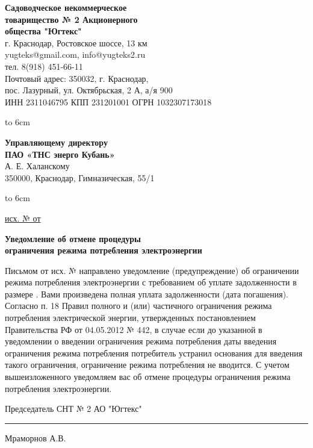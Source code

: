 \noindent\parbox[l][71mm]{80mm}
{
	 \begin{center}
 {\small \textbf{Садоводческое некоммерческое\\ товарищество
 	№  2 Акционерного\\ общества "Югтекс"\\
 }}
 \footnotesize{г. Краснодар, Ростовское шоссе, 13 км\\
 	yugteks@gmail.com, info@yugteks2.ru\\
 	тел. 8(918) 451-66-11\\
 	Почтовый адрес: 350032, г. Краснодар,\\ пос. Лазурный, ул. Октябрьская, 2 А, а/я   900
  }\\
 {ИНН 2311046795 КПП 231201001 ОГРН 1032307173018}
		\end{center}
\hbox to 6cm{ }}\hfill
\parbox[l][71mm]{65mm}
{ \begin{center}
	\small{
	\textbf{Управляющему директору\\ ПАО «ТНС энерго Кубань»}\\
	\vspace{3mm}
	А. Е. Халанскому\\
	\vspace{3mm}
 {\footnotesize 350000, Краснодар, Гимназическая, 55/1}

	}
\end{center}
\hbox to 6cm{ }}
\linebreak
\vspace{-12mm}

\underline{исх. №  от } 

\vspace{5mm}
\begin{center}
	\Large\textbf{Уведомление об отмене процедуры\\ 
		ограничения режима потребления электроэнергии}
\end{center}
\par
\vspace{5mm}



Письмом от          исх. №         направлено уведомление (предупреждение) об  ограничении режима потребления электроэнергии с требованием об уплате задолженности в размере            .
Вами произведена полная уплата задолженности                (дата погашения).
Согласно п. 18 Правил полного и (или) частичного ограничения режима потребления электрической энергии, утвержденных постановлением Правительства РФ от 04.05.2012 № 442, в случае если до указанной в уведомлении о введении ограничения режима потребления даты введения ограничения режима потребления потребитель устранил основания для введения такого ограничения, ограничение режима потребления не вводится.
С учетом вышеизложенного уведомляем вас об отмене процедуры ограничения режима потребления электроэнергии. 
\vspace{5mm}



\vspace{15mm}
\noindent Председатель СНТ № 2 АО "Югтекс" \hfill    \rule{3cm}{0.1 mm}    Мраморнов А.В.

\pagebreak
